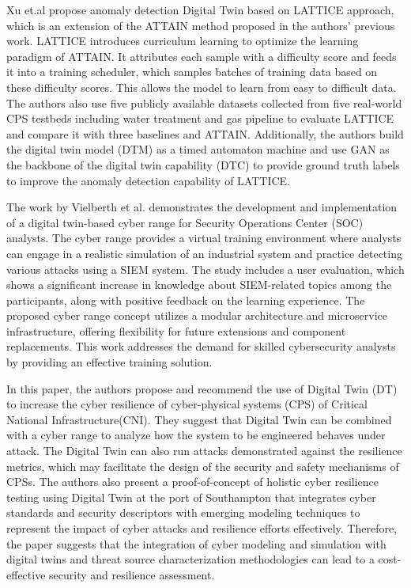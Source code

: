 Xu et.al \cite{xuDigitalTwinbasedAnomaly2023a} propose anomaly detection Digital Twin based on LATTICE approach, which is an extension of the ATTAIN method proposed in the authors' previous work. LATTICE introduces curriculum learning to optimize the learning paradigm of ATTAIN. It attributes each sample with a difficulty score and feeds it into a training scheduler, which samples batches of training data based on these difficulty scores. This allows the model to learn from easy to difficult data. The authors also use five publicly available datasets collected from five real-world CPS testbeds including water treatment and gas pipeline to evaluate LATTICE and compare it with three baselines and ATTAIN. Additionally, the authors build the digital twin model (DTM) as a timed automaton machine and use GAN as the backbone of the digital twin capability (DTC) to provide ground truth labels to improve the anomaly detection capability of LATTICE.


The work by Vielberth et al. \cite{vielberth2021digital} demonstrates the development and implementation of a digital twin-based cyber range for Security Operations Center (SOC) analysts. The cyber range provides a virtual training environment where analysts can engage in a realistic simulation of an industrial system and practice detecting various attacks using a SIEM system. The study includes a user evaluation, which shows a significant increase in knowledge about SIEM-related topics among the participants, along with positive feedback on the learning experience. The proposed cyber range concept utilizes a modular architecture and microservice infrastructure, offering flexibility for future extensions and component replacements. This work addresses the demand for skilled cybersecurity analysts by providing an effective training solution.



In \cite{epiphaniouDigitalTwinsCyber2023a} this paper, the authors propose and recommend the use of Digital Twin (DT) to increase the cyber resilience of cyber-physical systems (CPS) of Critical National Infrastructure(CNI). They suggest that Digital Twin can be combined with a cyber range to analyze how the system to be engineered behaves under attack. The Digital Twin can also run attacks demonstrated against the resilience metrics, which may facilitate the design of the security and safety mechanisms of CPSs. The authors also present a proof-of-concept of holistic cyber resilience testing using Digital Twin at the port of Southampton that integrates cyber standards and security descriptors with emerging modeling techniques to represent the impact of cyber attacks and resilience efforts effectively. Therefore, the paper suggests that the integration of cyber modeling and simulation with digital twins and threat source characterization methodologies can lead to a cost-effective security and resilience assessment.

